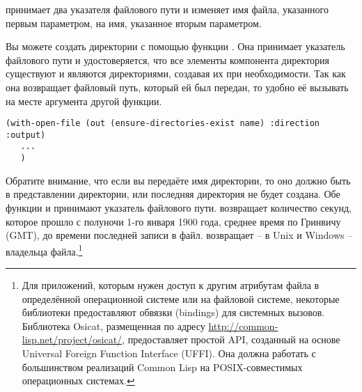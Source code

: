  принимает два указателя файлового пути и изменяет имя файла, указанного
первым параметром, на имя, указанное вторым параметром.

Вы можете создать директории с помощью функции . Она
принимает указатель файлового пути и удостоверяется, что все элементы компонента
директория существуют и являются директориями, создавая их при необходимости. Так как она
возвращает файловый путь, который ей был передан, то удобно её вызывать на месте аргумента
другой функции.

\begin{lstlisting}
(with-open-file (out (ensure-directories-exist name) :direction :output) 
   ... 
   ) 
\end{lstlisting}

Обратите внимание, что если вы передаёте  имя директории,
то оно должно быть в представлении директории, или последняя директория не будет
создана. Обе функции  и  принимают указатель
файлового пути.  возвращает количество секунд, которое прошло с
полуночи 1-го января 1900 года, среднее время по Гринвичу (GMT), до времени последней
записи в файл.  возвращает -- в Unix и Windows -- владельца
файла.\footnote{Для приложений, которым нужен доступ к другим атрибутам файла в
  определённой операционной системе или на файловой системе, некоторые библиотеки
  предоставляют обвязки (bindings) для системных вызовов. Библиотека Osicat, размещенная
  по адресу \url{http://common-lisp.net/project/osicat/}, предоставляет простой API,
  созданный на основе Universal Foreign Function Interface (UFFI). Она должна работать с
  большинством реализаций Common Lisp на POSIX-совместимых операционных системах.}


